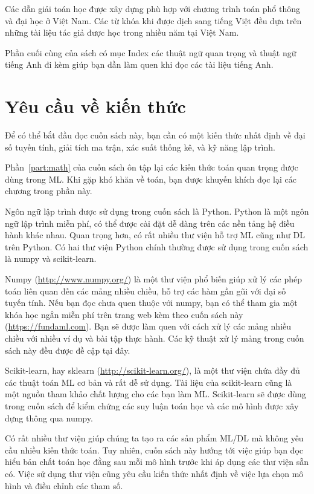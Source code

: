Các dẫn giải toán học được xây dựng phù hợp với chương trình toán phổ thông và
đại học ở Việt Nam. Các từ khóa khi được dịch sang tiếng Việt đều dựa trên những
tài liệu tác giả được học trong nhiều năm tại Việt Nam.

Phần cuối cùng của sách có mục Index các thuật ngữ quan trọng và thuật ngữ tiếng Anh đi kèm giúp bạn dần làm quen khi đọc các tài liệu tiếng Anh.


\section{Yêu cầu về kiến thức}

Để có thể bắt đầu đọc cuốn sách này, bạn cần có một kiến thức nhất định về đại
số tuyến tính, giải tích ma trận, xác suất thống kê, và kỹ năng lập trình.

Phần~\ref{part:math} của cuốn sách ôn tập lại các kiến thức toán quan trọng được
dùng trong ML. Khi gặp khó khăn về toán, bạn được khuyến khích đọc lại các
chương trong phần này.

Ngôn ngữ lập trình được sử dụng trong cuốn sách là Python. Python là một ngôn
ngữ lập trình miễn phí, có thể được cài đặt dễ dàng trên các nền tảng hệ điều
hành khác nhau. Quan trọng hơn, có rất nhiều thư viện hỗ trợ ML cũng như DL
trên Python. Có hai thư viện Python chính thường được sử dụng trong
cuốn sách là numpy và scikit-learn.

Numpy (\url{http://www.numpy.org/}) là một thư viện phổ biến giúp xử lý các phép
toán liên quan đến các mảng nhiều chiều, hỗ trợ các hàm gần gũi với đại số tuyến
tính. Nếu bạn đọc chưa quen thuộc với numpy, bạn có thể tham gia một khóa học
ngắn miễn phí trên trang web kèm theo cuốn sách này (\url{https://fundaml.com}).
Bạn sẽ được làm quen với cách xử lý các mảng nhiều chiều với nhiều ví dụ và bài
tập thực hành. Các kỹ thuật xử lý mảng trong cuốn sách này đều được đề cập tại
đây.

Scikit-learn, hay sklearn (\url{http://scikit-learn.org/}), là một thư viện chứa
đầy đủ các thuật toán ML cơ bản và rất dễ sử dụng. Tài liệu của scikit-learn
cũng là một nguồn tham khảo chất lượng cho các bạn làm ML. Scikit-learn sẽ được
dùng trong cuốn sách để kiểm chứng các suy luận toán học và các mô hình được xây
dựng thông qua numpy.

Có rất nhiều thư viện giúp chúng ta tạo ra các sản phẩm ML/DL mà không yêu
cầu nhiều kiến thức toán. Tuy nhiên, cuốn sách này hướng tới việc giúp bạn đọc
hiểu bản chất toán học đằng sau mỗi mô hình trước khi áp dụng các thư viện sẵn
có. Việc sử dụng thư viện cũng yêu cầu kiến thức nhất định về việc lựa chọn mô
hình và điều chỉnh các tham số.
